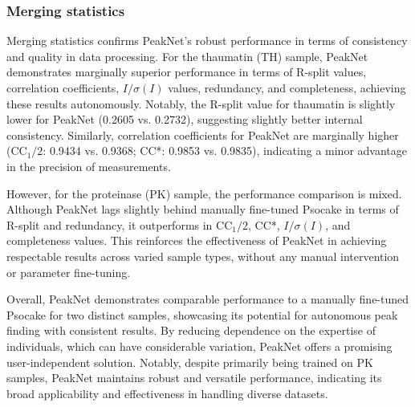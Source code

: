 \documentclass[a4paper]{article}
\newcommand{\peaknet}{PeakNet}
\newcommand{\psocake}{Psocake}
\begin{document}
\subsubsection{Merging statistics}

Merging statistics confirms \peaknet{}'s robust performance in terms of consistency and quality in data processing.  For the thaumatin (TH) sample, \peaknet{} demonstrates marginally superior performance in terms of R-split values, correlation coefficients, $I/\sigma(I)$ values, redundancy, and completeness, achieving these results autonomously.  Notably, the R-split value for thaumatin is slightly lower for \peaknet{} (0.2605 vs. 0.2732), suggesting slightly better internal consistency. Similarly, correlation coefficients for \peaknet{} are marginally higher (CC$_1/2$: 0.9434 vs.  0.9368; CC*: 0.9853 vs. 0.9835), indicating a minor advantage in the precision of measurements.

However, for the proteinase (PK) sample, the performance comparison is mixed.  Although \peaknet{} lags slightly behind manually fine-tuned \psocake{} in terms of R-split and redundancy, it outperforms in CC$_1/2$, CC*, $I/\sigma(I)$, and completeness values.  This reinforces the effectiveness of \peaknet{} in achieving respectable results across varied sample types, without any manual intervention or parameter fine-tuning.  

Overall, \peaknet{} demonstrates comparable performance to a manually fine-tuned \psocake{} for two distinct samples, showcasing its potential for autonomous peak finding with consistent results.  By reducing dependence on the expertise of individuals, which can have considerable variation, \peaknet{} offers a promising user-independent solution.  Notably, despite primarily being trained on PK samples, \peaknet{} maintains robust and versatile performance, indicating its broad applicability and effectiveness in handling diverse datasets.
\end{document}
